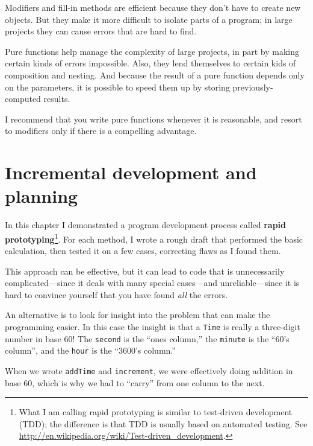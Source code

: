 Modifiers and fill-in methods are efficient because they
don't have to create new objects.  But they make it more
difficult to isolate parts of a program; in large projects they can
cause errors that are hard to find.

Pure functions help manage the complexity of large projects,
in part by making certain kinds of errors impossible.  Also, they
lend themselves to certain kids of composition and nesting.
And because the result of a pure function depends only on the parameters,
it is possible to speed them up by storing previously-computed
results.

I recommend that you write pure functions whenever
it is reasonable, and resort to modifiers only if there
is a compelling advantage.


\section{Incremental development and planning}

In this chapter I demonstrated a program development process called
{\bf rapid prototyping}\footnote{What I am calling rapid prototyping
  is similar to test-driven development (TDD); the difference is that
  TDD is usually based on automated testing.  See
  \url{http://en.wikipedia.org/wiki/Test-driven_development}.}.  For
each method, I wrote a rough draft that performed the
basic calculation, then tested it on a few cases, correcting flaws
as I found them.

This approach can be effective, but it can lead to code
that is unnecessarily complicated---since it deals with many
special cases---and unreliable---since it is hard to convince
yourself that you have found {\em all} the errors.

An alternative is to look for insight
into the problem that can make the programming easier.  In
this case the insight is that a {\tt Time} is really a three-digit
number in base 60!  The {\tt second} is the ``ones column,''
the {\tt minute} is the ``60's column'', and the {\tt hour}
is the ``3600's column.''

When we wrote {\tt addTime} and {\tt increment}, we were effectively
doing addition in base 60, which is why we had to ``carry'' from one
column to the next.


